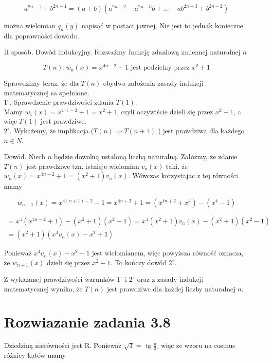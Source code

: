 \documentclass[10pt]{article}
\begin{document}
$$
a^{2 n-1}+b^{2 n-1}=(a+b)\left(a^{2 n-2}-a^{2 n-3} b+\ldots-a b^{2 n-3}+b^{2 n-2}\right)
$$

można wielomian $q_{n}(y)$ napisać w postaci jawnej. Nie jest to jednak konieczne dla poprawności dowodu.

II sposób. Dowód indukcyjny. Rozważmy funkcję zdaniową zmiennej naturalnej $n$

$$
T(n): w_{n}(x)=x^{4 n-2}+1 \text { jest podzielny przez } x^{2}+1
$$

Sprawdzimy teraz, że dla $T(n)$ obydwa założenia zasady indukcji matematycznej sa spełnione.\\
$1^{\circ}$. Sprawdzenie prawdziwości zdania $T(1)$.\\
Mamy $w_{1}(x)=x^{4 \cdot 1-2}+1=x^{2}+1$, czyli oczywiście dzieli się przez $x^{2}+1$, a więc $T(1)$ jest prawdziwe.\\
$2^{\circ}$. Wykażemy, że implikacja $(T(n) \Rightarrow T(n+1)$ ) jest prawdziwa dla każdego $n \in N$.

Dowód. Niech $n$ będzie dowolną ustaloną liczbą naturalną. Załóżmy, że zdanie $T(n)$ jest prawdziwe tzn. istnieje wielomian $v_{n}(x)$ taki, że $w_{n}(x)=x^{4 n-2}+1=\left(x^{2}+1\right) v_{n}(x)$. Wówczas korzystajac z tej równości mamy

$$
w_{n+1}(x)=x^{4(n+1)-2}+1=x^{4 n+2}+1=\left(x^{4 n+2}+x^{4}\right)-\left(x^{4}-1\right)
$$

$$
\begin{gathered}
=x^{4}\left(x^{4 n-2}+1\right)-\left(x^{2}+1\right)\left(x^{2}-1\right)=x^{4}\left(x^{2}+1\right) v_{n}(x)-\left(x^{2}+1\right)\left(x^{2}-1\right) \\
=\left(x^{2}+1\right)\left(x^{4} v_{n}(x)-x^{2}+1\right)
\end{gathered}
$$

Ponieważ $x^{4} v_{n}(x)-x^{2}+1$ jest wielomianem, więc powyższa równość oznacza, że $w_{n+1}(x)$ dzieli się przez $x^{2}+1$. To kończy dowód $2^{\circ}$.

Z wykazanej prawdziwości warunków $1^{\circ}$ i $2^{\circ}$ oraz z zasady indukcji matematycznej wynika, że $T(n)$ jest prawdziwe dla każdej liczby naturalnej $n$.

\section*{Rozwiazanie zadania 3.8}
Dziedziną nierówności jest R. Ponieważ $\sqrt{3}=\operatorname{tg} \frac{\pi}{3}$, więc ze wzoru na cosinus różnicy kạtów mamy
\end{document}
